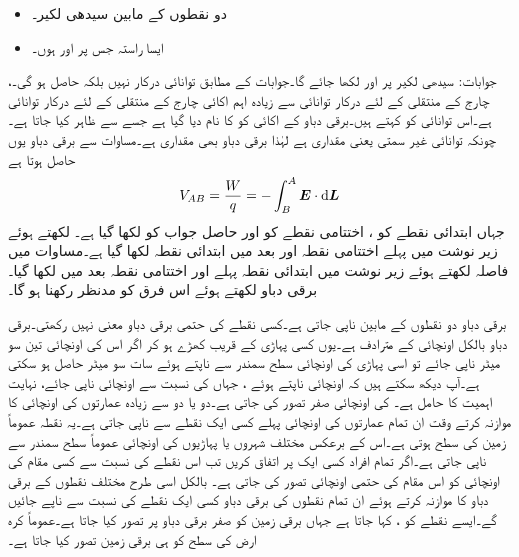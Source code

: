 \begin{itemize}
\item
دو نقطوں کے مابین سیدھی لکیر۔
\item
ایسا راستہ جس پر  اور  ہوں۔
\end{itemize}

جوابات: سیدھی لکیر پر  اور  لکھا جائے گا۔جوابات کے مطابق توانائی درکار نہیں بلکہ حاصل ہو گی۔،  
چارج  کے منتقلی کے لئے درکار  توانائی سے زیادہ اہم  اکائی چارج کے منتقلی کے لئے درکار توانائی ہے۔اس توانائی کو  کہتے  ہیں۔برقی دباو کے اکائی  کو  کا نام دیا گیا ہے جسے  سے ظاہر کیا جاتا ہے۔چونکہ توانائی غیر سمتی یعنی مقداری ہے لہٰذا برقی دباو بھی مقداری ہے۔مساوات  سے برقی دباو یوں حاصل ہوتا ہے
\begin{align}\label{مساوات_توانائی_برقی_دباو_تعریف}
V_{AB}=\frac{W}{q}=-\int_{B}^{A} \kvec{E} \cdot \dif\kvec{L}
\end{align}
جہاں ابتدائی نقطے کو ، اختتامی نقطے کو  اور حاصل جواب کو  لکھا گیا ہے۔ لکھتے ہوئے زیر نوشت میں پہلے اختتامی نقطہ   اور بعد میں ابتدائی نقطہ  لکھا گیا ہے۔مساوات  میں فاصلہ  لکھتے ہوئے زیر نوشت میں ابتدائی نقطہ  پہلے اور اختتامی نقطہ  بعد میں لکھا گیا۔برقی دباو   لکھتے ہوئے اس فرق کو مدنظر رکھنا ہو گا۔

برقی دباو دو نقطوں کے مابین ناپی جاتی ہے۔کسی نقطے کی حتمی برقی دباو معنی نہیں رکھتی۔برقی دباو بالکل اونچائی کے مترادف ہے۔یوں کسی پہاڑی کے قریب کھڑے ہو کر اگر اس کی اونچائی تین سو میٹر ناپی جائے تو اسی پہاڑی کی اونچائی سطح سمندر سے ناپتے ہوئے سات سو میٹر حاصل ہو سکتی ہے۔آپ دیکھ سکتے ہیں کہ اونچائی ناپتے ہوئے ، جہاں کی نسبت سے اونچائی ناپی جائے، نہایت اہمیت کا حامل  ہے۔ کی اونچائی صفر تصور کی جاتی ہے۔دو یا دو سے زیادہ  عمارتوں کی اونچائی کا موازنہ کرتے وقت ان تمام عمارتوں کی اونچائی پہلے کسی ایک نقطے سے ناپی جاتی ہے۔یہ نقطہ عموماً زمین کی سطح ہوتی ہے۔اس کے برعکس مختلف شہروں یا پہاڑیوں کی اونچائی عموماً سطح سمندر سے ناپی جاتی ہے۔اگر تمام افراد کسی ایک  پر اتفاق کریں تب اس نقطے کی نسبت سے کسی مقام کی اونچائی کو اس مقام کی حتمی اونچائی تصور کی جاتی ہے۔ بالکل اسی طرح مختلف نقطوں کے برقی دباو کا موازنہ کرتے ہوئے ان تمام نقطوں کی برقی دباو کسی ایک نقطے کی نسبت سے ناپے جائیں گے۔ایسے نقطے کو ، کہا جاتا ہے جہاں برقی زمین کو صفر  برقی دباو پر تصور کیا جاتا ہے۔عموماً کرہ ارض کی سطح کو ہی برقی زمین تصور کیا جاتا ہے۔

